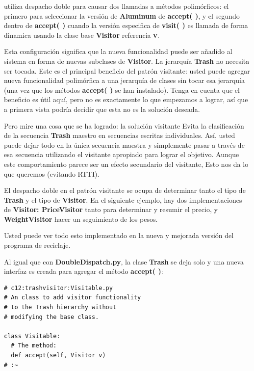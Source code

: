 \documentclass{article}
\begin{document}
utiliza despacho doble para causar dos llamadas a métodos polimórficos: el primero para seleccionar la versión de \textbf{Aluminum} de \textbf{accept( )}, y el segundo dentro de \textbf{accept( )} cuando la versión especifica de \textbf{visit( )} es llamada de forma dinamica usando la clase base \textbf{Visitor} referencia \textbf{v}.         \newline

Esta configuración significa que la nueva funcionalidad puede ser añadido al sistema en forma de nuevas subclases de \textbf{Visitor}. La jerarquía \textbf{Trash} no necesita ser tocada. Este es el principal beneficio del patrón visitante: usted puede agregar nueva funcionalidad polimórfica a una jerarquía de clases sin tocar esa jerarquía (una vez que los métodos \textbf{accept( )} se han instalado). Tenga en cuenta que el beneficio es útil aquí, pero no es exactamente lo que empezamos a lograr, así que a primera vista podría decidir que esta no es la solución deseada.      \newline

Pero mire una cosa que se ha logrado: la solución visitante Evita la clasificación de la secuencia \textbf{Trash} maestro en secuencias escritas individuales. Así, usted puede dejar todo en la única secuencia maestra y simplemente pasar a través de esa secuencia utilizando el visitante apropiado para lograr el objetivo. Aunque este comportamiento parece ser un efecto secundario del visitante, Esto nos da lo que queremos (evitando RTTI).       \newline

El despacho doble en el patrón visitante se ocupa de determinar tanto el tipo de \textbf{Trash} y el tipo de \textbf{Visitor}. En el siguiente ejemplo, hay dos implementaciones de \textbf{Visitor: PriceVisitor} tanto para determinar y resumir el precio, y \textbf{WeightVisitor} hacer un seguimiento de los pesos.      \newline

Usted puede ver todo esto implementado en la nueva y mejorada versión del programa de reciclaje.        \newline

Al igual que con \textbf{DoubleDispatch.py}, la clase \textbf{Trash} se deja solo y una nueva interfaz es creada para agregar el método \textbf{accept( )}: \newline

\begin{lstlisting} 
# c12:trashvisitor:Visitable.py 
# An class to add visitor functionality  
# to the Trash hierarchy without  
# modifying the base class. 

class Visitable: 
  # The method: 
  def accept(self, Visitor v) 
# :~ 
\end{lstlisting}
\end{document}
